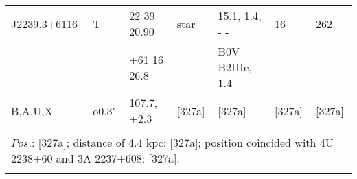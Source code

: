 \documentclass{aa}
\begin{document}
\begin{table*}[h]
\begin{tabular}{p{2.5cm}p{1cm}p{1.8cm}p{2.3cm}p{3.3cm}p{2.0cm}p{2.2cm}}
\noalign{\smallskip}
\hline
\noalign{\smallskip}
 J2239.3+6116  & T              & 22 39 20.90     & star                   & 15.1, 1.4, - -                & 16             & 262         \\
                             &                 & +61 16 26.8     &                            & B0V-B2IIIe, 1.4         &                  &                 \\
B,A,U,X              & o0.3"      & 107.7, +2.3      &     [327a]            & [327a]                         & [327a]      & [327a]     \\
\\
\multicolumn{7}{p{17.5cm}}{
$Pos$.: [327a]; distance of 4.4 kpc: [327a]; position coincided with 4U 2238+60 and 3A 2237+608: [327a]. }\\

\noalign{\smallskip}
\hline

\end{tabular}
\end{table*}


\clearpage
\end{document}

